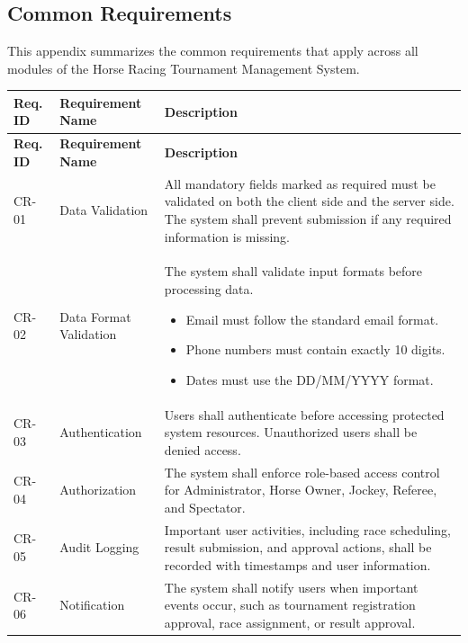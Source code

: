 \subsection{Common Requirements}

This appendix summarizes the common requirements that apply across all modules of the Horse Racing Tournament Management System.

\renewcommand{\arraystretch}{1.5}

\begin{longtable}{|p{2cm}|p{4cm}|p{9cm}|}
\hline
\rowcolor{gray!20}
\textbf{Req. ID} &
\textbf{Requirement Name} &
\textbf{Description} \\ \hline
\endfirsthead

\hline
\rowcolor{gray!20}
\textbf{Req. ID} &
\textbf{Requirement Name} &
\textbf{Description} \\ \hline
\endhead

CR-01 &
Data Validation &
All mandatory fields marked as required must be validated on both the client side and the server side. The system shall prevent submission if any required information is missing. \\ \hline

CR-02 &
Data Format Validation &
The system shall validate input formats before processing data.
\begin{itemize}
\item Email must follow the standard email format.
\item Phone numbers must contain exactly 10 digits.
\item Dates must use the DD/MM/YYYY format.
\end{itemize}
\\ \hline

CR-03 &
Authentication &
Users shall authenticate before accessing protected system resources. Unauthorized users shall be denied access. \\ \hline

CR-04 &
Authorization &
The system shall enforce role-based access control for Administrator, Horse Owner, Jockey, Referee, and Spectator. \\ \hline

CR-05 &
Audit Logging &
Important user activities, including race scheduling, result submission, and approval actions, shall be recorded with timestamps and user information. \\ \hline

CR-06 &
Notification &
The system shall notify users when important events occur, such as tournament registration approval, race assignment, or result approval. \\ \hline


\end{longtable}
